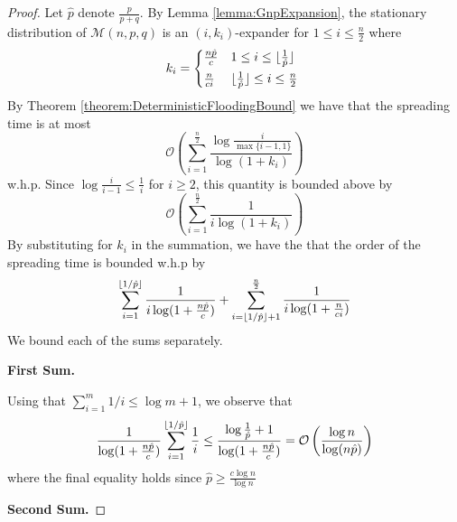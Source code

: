 \begin{proof}
	Let $\hat{p}$ denote $\frac{p}{p+q}$. 
	By Lemma \ref{lemma:GnpExpansion}, the stationary distribution of $\mathcal{M}(n, p, q)$ is an $(i, k_i)$-expander for $1 \leq i \leq \frac{n}{2}$ where 
	\begin{equation*}
		k_i = 
		\begin{cases*}
			\frac{n\hat{p}}{c} & $1 \leq i \leq \floor{\frac{1}{\hat{p}}}$ \\
			\frac{n}{ci} & $\floor{\frac{1}{\hat{p}}} \leq i \leq \frac{n}{2}$
		\end{cases*}
	\end{equation*}
	By Theorem \ref{theorem:DeterministicFloodingBound} we have that the spreading time is at most
	$$
		\mathcal{O}\left(\sum_{i=1}^\frac{n}{2} \frac{\log \frac{i}{\max\{i-1,1\}}}{\log(1+k_i)}\right)
	$$
	w.h.p.
	Since $\log \frac{i}{i-1} \leq \frac{1}{i}$ for $i \geq 2$, %
	this quantity is bounded above by 
	$$
		\mathcal{O}\left(\sum_{i=1}^\frac{n}{2} \frac{1}{i\log(1+k_i)}\right)
	$$
	By substituting for $k_i$ in the summation, we have the that the order of the spreading time is bounded w.h.p by
	$$
		\sum_{i=1}^{\lfloor1/\hat{p}\rfloor} \frac{1}{i\log(1+\frac{n\hat{p}}{c})} 
		+
		\sum_{i=\lfloor1/\hat{p}\rfloor + 1}^\frac{n}{2} \frac{1}{i\log(1+\frac{n}{ci})} 
	$$
	We bound each of the sums separately.

	\textbf{First Sum.}

	Using that $\sum_{i=1}^m 1/i \leq \log m + 1$, 
	we observe that
	$$
		\frac{1}{\log(1+\frac{n\hat{p}}{c})} \sum_{i=1}^{\lfloor1/\hat{p}\rfloor} \frac{1}{i} 
		\leq 
		\frac{\log \frac{1}{\hat{p}} + 1}{\log(1+\frac{n\hat{p}}{c})} 
		= 
		\mathcal{O}\left(\frac{\log n}{\log(n\hat{p})}\right)
	$$
	where the final equality holds since $\hat{p} \geq \frac{c \log n}{\log n}$

	\textbf{Second Sum.}


\end{proof}
